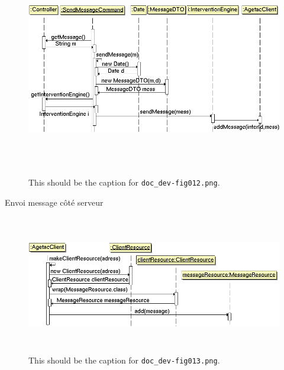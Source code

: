 \documentclass{article}
\begin{document}
\begin{figure}[htbp]
\begin{center}
\includegraphics[width=531pt, height=268pt]{doc_dev-fig012.png}
\caption{This should be the caption for \texttt{doc\_dev-fig012.png}.}
\end{center}
\end{figure}

\vspace{27pt}
{\color{color01} Envoi message côté serveur}

\begin{figure}[htbp]
\begin{center}
\includegraphics[width=515pt, height=172pt]{doc_dev-fig013.png}
\caption{This should be the caption for \texttt{doc\_dev-fig013.png}.}
\end{center}
\end{figure}
\end{document}
